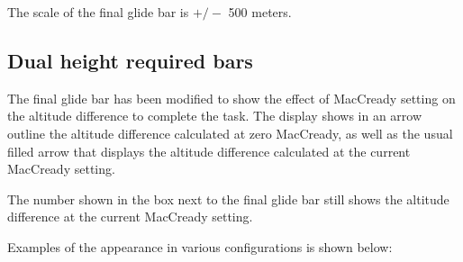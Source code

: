 \documentclass[a4paper,12pt]{refrep}
\begin{document}
The scale of the final glide bar is $+/-$ 500 meters.

\subsection*{Dual height required bars}

The final glide bar has been modified to show the effect of MacCready
setting on the altitude difference to complete the task.  The display
shows in an arrow outline the altitude difference calculated at zero
MacCready, as well as the usual filled arrow that displays the
altitude difference calculated at the current MacCready setting.

The number shown in the box next to the final glide bar still shows
the altitude difference at the current MacCready setting.

Examples of the appearance in various configurations is shown below:
\end{document}
